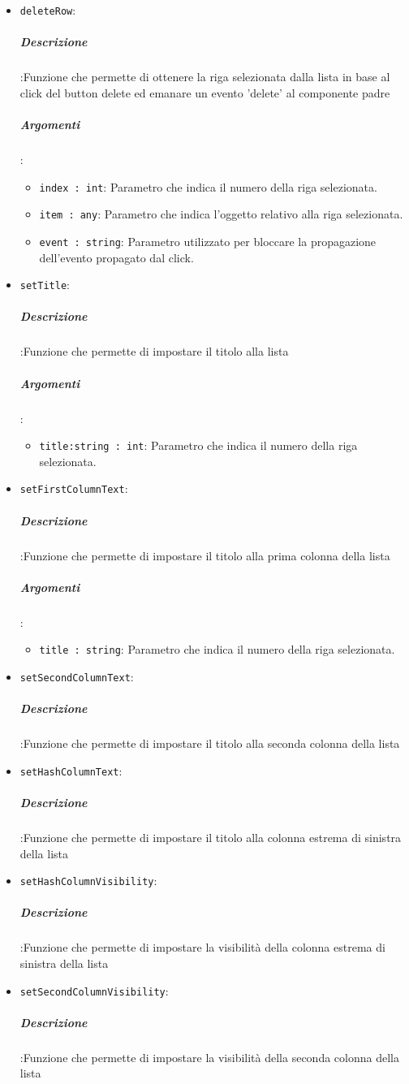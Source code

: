 \documentclass[../DefinizioneDiProdotto_v3.0.0.tex]{subfiles}
\begin{document}
\begin{itemize}
			      	      	\item \texttt{deleteRow}:
							\subparagraph{Descrizione}:Funzione che permette di ottenere la riga selezionata dalla lista in base al click del button delete ed emanare un evento 'delete' al componente padre
			      	      	\subparagraph{Argomenti}:
			      	      	      \begin{itemize}
			      	      	      	\item \texttt{index : int}: Parametro che indica il numero della riga selezionata.
			      	      	      	\item \texttt{item : any}: Parametro che indica l'oggetto relativo alla riga selezionata.
			      	      	      	\item \texttt{event : string}: Parametro utilizzato per bloccare la propagazione dell'evento propagato dal click.
			      	      	      \end{itemize}
			      	      	\item \texttt{setTitle}:
							\subparagraph{Descrizione}:Funzione che permette di impostare il titolo alla lista
							\subparagraph{Argomenti}:
			      	      	      \begin{itemize}
			      	      	      	\item \texttt{title:string : int}: Parametro che indica il numero della riga selezionata.
			      	      	      \end{itemize}
			      	      	\item \texttt{setFirstColumnText}:
							\subparagraph{Descrizione}:Funzione che permette di impostare il titolo alla prima colonna della lista
							\subparagraph{Argomenti}:
			      	      	      \begin{itemize}
			      	      	      	\item \texttt{title : string}: Parametro che indica il numero della riga selezionata.
			      	      	      \end{itemize}
			      	      	\item \texttt{setSecondColumnText}:
							\subparagraph{Descrizione}:Funzione che permette di impostare il titolo alla seconda colonna della lista

			      	      	\item \texttt{setHashColumnText}:
							\subparagraph{Descrizione}:Funzione che permette di impostare il titolo alla colonna estrema di sinistra della lista

			      	      	\item \texttt{setHashColumnVisibility}:
							\subparagraph{Descrizione}:Funzione che permette di impostare la visibilità della colonna estrema di sinistra della lista
			      	      	\item \texttt{setSecondColumnVisibility}:
							\subparagraph{Descrizione}:Funzione che permette di impostare la visibilità della seconda colonna della lista
			      \end{itemize}
\end{document}
